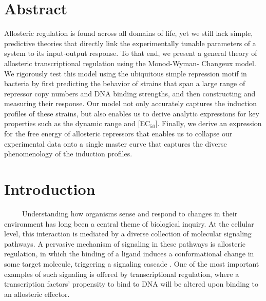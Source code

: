 \documentclass[12pt]{caltech_thesis}
\begin{document}
\hypertarget{abstract}{%
\section{Abstract}\label{abstract}}

Allosteric regulation is found across all domains of life, yet we still
lack simple, predictive theories that directly link the experimentally
tunable parameters of a system to its input-output response. To that
end, we present a general theory of allosteric transcriptional
regulation using the Monod-Wyman- Changeux model. We rigorously test
this model using the ubiquitous simple repression motif in bacteria by
first predicting the behavior of strains that span a large range of
repressor copy numbers and DNA binding strengths, and then constructing
and measuring their response. Our model not only accurately captures the
induction profiles of these strains, but also enables us to derive
analytic expressions for key properties such as the dynamic range and
{[}EC\(_{50}\){]}. Finally, we derive an expression for the free energy
of allosteric repressors that enables us to collapse our experimental
data onto a single master curve that captures the diverse phenomenology
of the induction profiles.

\hypertarget{introduction-1}{%
\section{Introduction}\label{introduction-1}}

~~~~~Understanding how organisms sense and respond to changes in their
environment has long been a central theme of biological inquiry. At the
cellular level, this interaction is mediated by a diverse collection of
molecular signaling pathways. A pervasive mechanism of signaling in
these pathways is allosteric regulation, in which the binding of a
ligand induces a conformational change in some target molecule,
triggering a signaling cascade \autocite{lindsley2006a}. One of the most
important examples of such signaling is offered by transcriptional
regulation, where a transcription factors' propensity to bind to DNA
will be altered upon binding to an allosteric effector.
\end{document}
